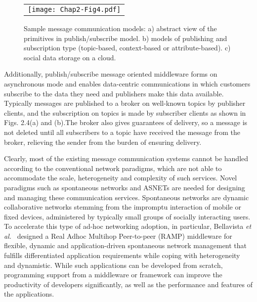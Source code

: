 \begin{figure}[t]
\begin{center}
  \begin{tabular}{c}
  \texttt{[image: Chap2-Fig4.pdf]}
  \end{tabular}
  \caption{Sample message communication models: a) abstract view of the primitives in publish/subscribe model. b) models of publishing and subscription type (topic-based, context-based or attribute-based). c) social data storage on a cloud.}
\end{center}
\end{figure}

Additionally, publish/subscribe message oriented middleware forms on asynchronous mode and enables data-centric communications in which customers subscribe to the data they need and publishers make this data available. Typically messages are published to a broker on well-known topics by publisher clients, and the subscription on topics is made by subscriber clients as shown in Figs. 2.4(a) and (b).The broker also gives guarantees of delivery, so a message is not deleted until all subscribers to a topic have received the message from the broker, relieving the sender from the burden of ensuring delivery.

Clearly, most of the existing message communication systems cannot be handled according to the conventional network paradigms, which are not able to accommodate the scale, heterogeneity and complexity of such services. Novel paradigms such as spontaneous networks and ASNETs are needed for designing and managing these communication services. Spontaneous networks are dynamic collaborative networks stemming from the impromptu interaction of mobile or fixed devices, administered by typically small groups of socially interacting users. To accelerate this type of ad-hoc networking adoption, in particular, Bellavista {\it et al.}~\cite{PBellavista2012} designed a Real Adhoc Multihop Peer-to-peer (RAMP) middleware for flexible, dynamic and application-driven spontaneous network management that fulfills differentiated application requirements while coping with heterogeneity and dynamistic. While such applications can be developed from scratch, programming support from a middleware or framework can improve the productivity of developers significantly, as well as the performance and features of the applications.


